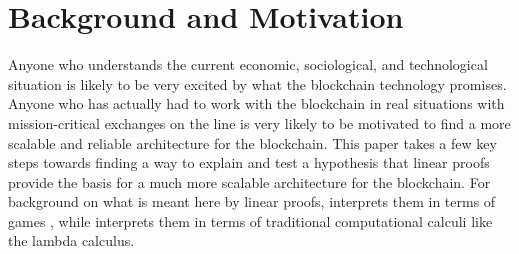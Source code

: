 \documentclass[]{acm_proc_article-sp}
\title{\papertitle}
\author{
L.G. Meredith\\
  \affaddr{CSO, Synereo}\\
  \email{\fontsize{8}{8}\selectfont greg@synereo.com}
}
\numberwithin{equation}{subsection}
\newcommand{\paperversion}{Draft Version 0.1 - Jan 7, 2015}
\newenvironment{toc}
{
\begin{list}{}{
   \setlength{\leftmargin}{0.4in}
   \setlength{\rightmargin}{0.6in}
   \setlength{\parskip}{0pt}
 } \item }
{\end{list}}
\begin{document}
\lstset{language=}

\setlength{\topmargin}{0in}
\setlength{\textheight}{8.5in}
\setlength{\parskip}{6pt}


\begin{abstract}
\normalsize{ 

  We present an interpretation of classical linear logic in terms of operations on the blockchain.

}

\end{abstract}


\maketitle




\section{Background and Motivation}

Anyone who understands the current economic, sociological, and
technological situation is likely to be very excited by what the
blockchain technology promises. Anyone who has actually had to work
with the blockchain in real situations with mission-critical
exchanges on the line is very likely to be motivated to find a
more scalable and reliable architecture for the blockchain. This paper
takes a few key steps towards finding a way to explain and test a
hypothesis that linear proofs provide the basis for a much more
scalable architecture for the blockchain. For background on what is
meant here by linear proofs, \cite{DBLP:conf/lics/AbramskyM99}
interprets them in terms of games , while
\cite{DBLP:journals/tcs/Abramsky93} interprets them in terms of
traditional computational calculi like the lambda calculus.
\end{document}
